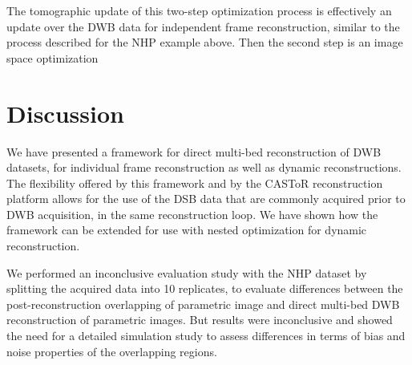 The tomographic update of this two-step optimization process is effectively an update over the DWB data for independent frame reconstruction, similar to the process described for the NHP example above. Then the second step is an image space optimization






\section{Discussion}
We have presented a framework for direct multi-bed reconstruction of DWB datasets, for individual frame reconstruction as well as dynamic reconstructions. The flexibility offered by this framework and by the CASToR reconstruction platform allows for the use of the DSB data that are commonly acquired prior to DWB acquisition, in the same reconstruction loop. We have shown how the framework can be extended for use with nested optimization for dynamic reconstruction.

We performed an inconclusive evaluation study with the NHP dataset by splitting the acquired data into 10 replicates, to evaluate differences between the post-reconstruction overlapping of parametric image and direct multi-bed DWB reconstruction of parametric images. But results were inconclusive and showed the need for a detailed simulation study to assess differences in terms of bias and noise properties of the overlapping regions. 
